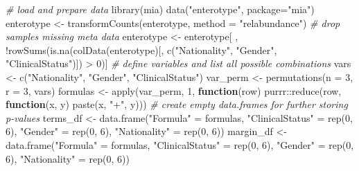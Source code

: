\documentclass[
]{book}
\newenvironment{Shaded}{\begin{snugshade}}{\end{snugshade}}
\newcommand{\AttributeTok}[1]{\textcolor[rgb]{0.77,0.63,0.00}{#1}}
\newcommand{\CommentTok}[1]{\textcolor[rgb]{0.56,0.35,0.01}{\textit{#1}}}
\newcommand{\ControlFlowTok}[1]{\textcolor[rgb]{0.13,0.29,0.53}{\textbf{#1}}}
\newcommand{\DecValTok}[1]{\textcolor[rgb]{0.00,0.00,0.81}{#1}}
\newcommand{\FunctionTok}[1]{\textcolor[rgb]{0.00,0.00,0.00}{#1}}
\newcommand{\NormalTok}[1]{#1}
\newcommand{\OtherTok}[1]{\textcolor[rgb]{0.56,0.35,0.01}{#1}}
\newcommand{\SpecialCharTok}[1]{\textcolor[rgb]{0.00,0.00,0.00}{#1}}
\newcommand{\StringTok}[1]{\textcolor[rgb]{0.31,0.60,0.02}{#1}}
\begin{document}
\begin{Shaded}
\begin{Highlighting}[]
\CommentTok{\# load and prepare data}
\FunctionTok{library}\NormalTok{(mia)}
\FunctionTok{data}\NormalTok{(}\StringTok{"enterotype"}\NormalTok{, }\AttributeTok{package=}\StringTok{"mia"}\NormalTok{)}
\NormalTok{enterotype }\OtherTok{\textless{}{-}} \FunctionTok{transformCounts}\NormalTok{(enterotype, }\AttributeTok{method =} \StringTok{"relabundance"}\NormalTok{)}
\CommentTok{\# drop samples missing meta data}
\NormalTok{enterotype }\OtherTok{\textless{}{-}}\NormalTok{ enterotype[ , }\SpecialCharTok{!}\FunctionTok{rowSums}\NormalTok{(}\FunctionTok{is.na}\NormalTok{(}\FunctionTok{colData}\NormalTok{(enterotype)[, }\FunctionTok{c}\NormalTok{(}\StringTok{"Nationality"}\NormalTok{, }\StringTok{"Gender"}\NormalTok{, }\StringTok{"ClinicalStatus"}\NormalTok{)]) }\SpecialCharTok{\textgreater{}} \DecValTok{0}\NormalTok{)]}
\CommentTok{\# define variables and list all possible combinations}
\NormalTok{vars }\OtherTok{\textless{}{-}} \FunctionTok{c}\NormalTok{(}\StringTok{"Nationality"}\NormalTok{, }\StringTok{"Gender"}\NormalTok{, }\StringTok{"ClinicalStatus"}\NormalTok{)}
\NormalTok{var\_perm }\OtherTok{\textless{}{-}} \FunctionTok{permutations}\NormalTok{(}\AttributeTok{n =} \DecValTok{3}\NormalTok{, }\AttributeTok{r =} \DecValTok{3}\NormalTok{, vars)}
\NormalTok{formulas }\OtherTok{\textless{}{-}} \FunctionTok{apply}\NormalTok{(var\_perm, }\DecValTok{1}\NormalTok{, }\ControlFlowTok{function}\NormalTok{(row) purrr}\SpecialCharTok{::}\FunctionTok{reduce}\NormalTok{(row, }\ControlFlowTok{function}\NormalTok{(x, y) }\FunctionTok{paste}\NormalTok{(x, }\StringTok{"+"}\NormalTok{, y)))}
\CommentTok{\# create empty data.frames for further storing p{-}values}
\NormalTok{terms\_df }\OtherTok{\textless{}{-}} \FunctionTok{data.frame}\NormalTok{(}\StringTok{"Formula"} \OtherTok{=}\NormalTok{ formulas,}
                       \StringTok{"ClinicalStatus"} \OtherTok{=} \FunctionTok{rep}\NormalTok{(}\DecValTok{0}\NormalTok{, }\DecValTok{6}\NormalTok{),}
                       \StringTok{"Gender"} \OtherTok{=} \FunctionTok{rep}\NormalTok{(}\DecValTok{0}\NormalTok{, }\DecValTok{6}\NormalTok{),}
                       \StringTok{"Nationality"} \OtherTok{=} \FunctionTok{rep}\NormalTok{(}\DecValTok{0}\NormalTok{, }\DecValTok{6}\NormalTok{))}
\NormalTok{margin\_df }\OtherTok{\textless{}{-}} \FunctionTok{data.frame}\NormalTok{(}\StringTok{"Formula"} \OtherTok{=}\NormalTok{ formulas,}
                        \StringTok{"ClinicalStatus"} \OtherTok{=} \FunctionTok{rep}\NormalTok{(}\DecValTok{0}\NormalTok{, }\DecValTok{6}\NormalTok{),}
                        \StringTok{"Gender"} \OtherTok{=} \FunctionTok{rep}\NormalTok{(}\DecValTok{0}\NormalTok{, }\DecValTok{6}\NormalTok{),}
                        \StringTok{"Nationality"} \OtherTok{=} \FunctionTok{rep}\NormalTok{(}\DecValTok{0}\NormalTok{, }\DecValTok{6}\NormalTok{))}
\end{Highlighting}
\end{Shaded}
\end{document}
